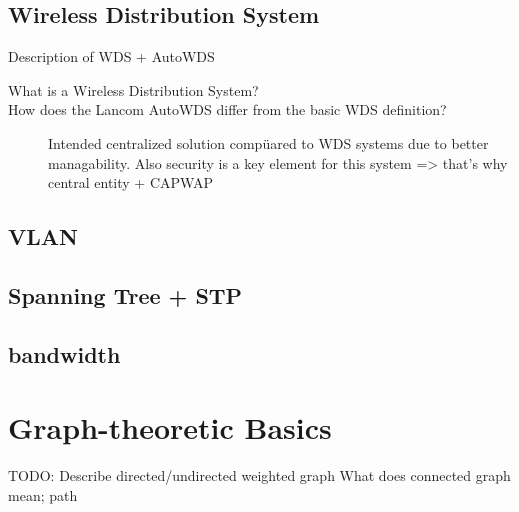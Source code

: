     \subsection{Wireless Distribution System}
    Description of WDS + AutoWDS \newline
      \begin{description}
       \item[What is a Wireless Distribution System?]
       \item[How does the Lancom AutoWDS differ from the basic WDS definition?]
	 Intended centralized solution compüared to WDS systems due to better managability.
	 Also security is a key element for this system => that's why central entity + CAPWAP
      \end{description}
      \subsection{VLAN}
      \subsection{Spanning Tree + STP}
      \subsection{bandwidth}
\section{Graph-theoretic Basics}
  TODO: Describe directed/undirected weighted graph
  What does connected graph mean; path
